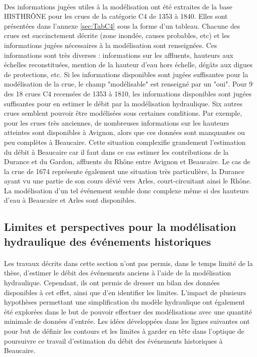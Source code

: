 \documentclass[11pt]{article}
\begin{document}
	\paragraph{} Des informations jugées utiles à la modélisation ont été extraites de la base HISTHRÔNE pour les crues de la catégorie C4 de 1353 à 1840. Elles sont présentées dans l'annexe \ref{sec:TabC4} sous la forme d'un tableau. Chacune des crues est succinctement décrite (zone inondée, causes probables, etc) et les informations jugées nécessaires à la modélisation sont renseignées. Ces informations sont très diverses : informations sur les affluents, hauteurs aux échelles reconstituées, mention de la hauteur d'eau hors échelle, dégâts aux digues de protections, etc. Si les informations disponibles sont jugées suffisantes pour la modélisation de la crue, le champ "modélisable" est renseigné par un "oui". Pour 9 des 18 crues C4 recensées de 1353 à 1810, les informations disponibles sont jugées suffisantes pour en estimer le débit par la modélisation hydraulique. Six autres crues semblent pouvoir être modélisées sous certaines conditions. Par exemple, pour les crues très anciennes, de nombreuses informations sur les hauteurs atteintes sont disponibles à Avignon, alors que ces données sont manquantes ou peu complètes à Beaucaire. Cette situation complexifie grandement l'estimation du débit à Beaucaire car il faut dans ce cas estimer les contributions de la Durance et du Gardon, affluents du Rhône entre Avignon et Beaucaire. Le cas de la crue de 1674 représente également une situation très particulière, la Durance ayant vu une partie de son cours dévié vers Arles, court-circuitant ainsi le Rhône. La modélisation d'un tel événement semble donc complexe même si des hauteurs d'eau à Beaucaire et Arles sont disponibles.
		
		
	\subsection{Limites et perspectives pour la modélisation hydraulique des événements historiques}
	
	\paragraph{} Les travaux décrits dans cette section n'ont pas permis, dans le temps limité de la thèse, d'estimer le débit des événements anciens à l'aide de la modélisation hydraulique. Cependant, ils ont permis de dresser un bilan des données disponibles à cet effet, ainsi que d'en identifier les limites. L'impact de plusieurs hypothèses permettant une simplification du modèle hydraulique ont également été explorées dans le but de pouvoir effectuer des modélisations avec une quantité minimale de données d'entrée. Les idées développées dans les lignes suivantes ont pour but de définir les contours et les limites à garder en tête dans l'optique de poursuivre ce travail d'estimation du débit des événements historiques à Beaucaire.
	
\end{document}
